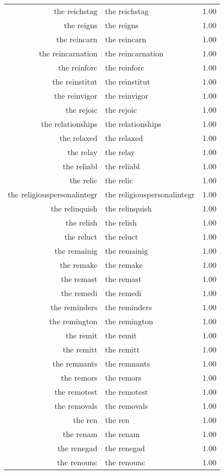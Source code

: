 \begin{table}[ht]
\begin{tabular}{rlr}
  the reichstag & the reichstag & 1.00 \\ 
  the reigns & the reigns & 1.00 \\ 
  the reincarn & the reincarn & 1.00 \\ 
  the reincarnation & the reincarnation & 1.00 \\ 
  the reinforc & the reinforc & 1.00 \\ 
  the reinstitut & the reinstitut & 1.00 \\ 
  the reinvigor & the reinvigor & 1.00 \\ 
  the rejoic & the rejoic & 1.00 \\ 
  the relationships & the relationships & 1.00 \\ 
  the relaxed & the relaxed & 1.00 \\ 
  the relay & the relay & 1.00 \\ 
  the reliabl & the reliabl & 1.00 \\ 
  the relic & the relic & 1.00 \\ 
  the religiouspersonalintegr & the religiouspersonalintegr & 1.00 \\ 
  the relinquish & the relinquish & 1.00 \\ 
  the relish & the relish & 1.00 \\ 
  the reluct & the reluct & 1.00 \\ 
  the remainig & the remainig & 1.00 \\ 
  the remake & the remake & 1.00 \\ 
  the remast & the remast & 1.00 \\ 
  the remedi & the remedi & 1.00 \\ 
  the reminders & the reminders & 1.00 \\ 
  the remington & the remington & 1.00 \\ 
  the remit & the remit & 1.00 \\ 
  the remitt & the remitt & 1.00 \\ 
  the remnants & the remnants & 1.00 \\ 
  the remors & the remors & 1.00 \\ 
  the remotest & the remotest & 1.00 \\ 
  the removals & the removals & 1.00 \\ 
  the ren & the ren & 1.00 \\ 
  the renam & the renam & 1.00 \\ 
  the renegad & the renegad & 1.00 \\ 
  the renounc & the renounc & 1.00 \\ 

\end{tabular}
\end{table}
